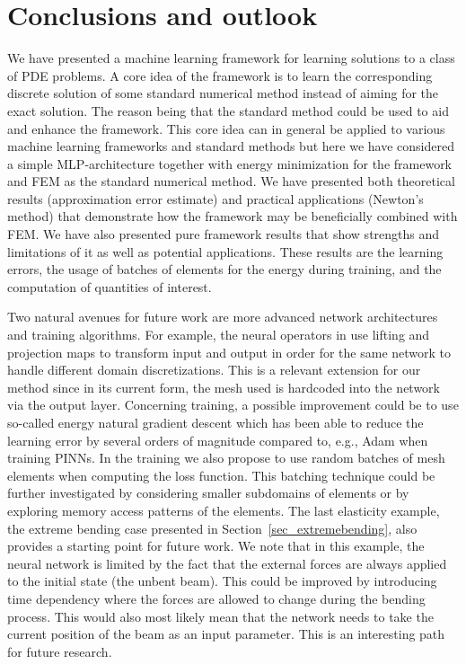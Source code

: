 \documentclass[12pt]{article}
\begin{document}
\section{Conclusions and outlook}

We have presented a machine learning framework for learning solutions to a class of PDE problems. A core idea of the framework is to learn the corresponding discrete solution of some standard numerical method instead of aiming for the exact solution. The reason being that the standard method could be used to aid and enhance the framework. This core idea can in general be applied to various machine learning frameworks and standard methods but here we have considered a simple MLP-architecture together with energy minimization for the framework and FEM as the standard numerical method. We have presented both theoretical results (approximation error estimate) and practical applications (Newton's method) that demonstrate how the framework may be beneficially combined with FEM. We have also presented pure framework results that show strengths and limitations of it as well as potential applications. These results are the learning errors, the usage of batches of elements for the energy during training, and the computation of quantities of interest.

Two natural avenues for future work are more advanced network architectures and training algorithms. For example, the neural operators in \cite{MR4582511} use lifting and projection maps to transform input and output in order for the same network to handle different domain discretizations. This is a relevant extension for our method since in its current form, the mesh used is hardcoded into the network via the output layer. Concerning training, a possible improvement could be to use so-called energy natural gradient descent \cite{muller23b} which has been able to reduce the learning error by several orders of magnitude compared to, e.g., Adam when training PINNs. In the training we also propose to use random batches of mesh elements when computing the loss function. This batching technique could be further investigated by considering smaller subdomains of elements or by exploring memory access patterns of the elements. The last elasticity example, the extreme bending case presented in Section~\ref{sec_extremebending}, also provides a starting point for future work. We note that in this example, the neural network is limited by the fact that the external forces are always applied to the initial state (the unbent beam). This could be improved by introducing time dependency where the forces are allowed to change during the bending process. This would also most likely mean that the network needs to take the current position of the beam as an input parameter. This is an interesting path for future research.
\end{document}
